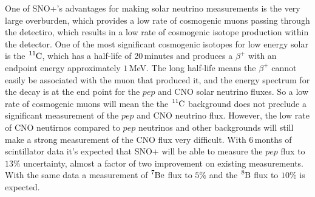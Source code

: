 One of SNO+'s advantages for making solar neutrino measurements is the
very large overburden, which provides a low rate of cosmogenic 
muons passing through the detectiro, which results in a low rate of
cosmogenic isotope production within the detector.
One of the most significant cosmogenic isotopes for low energy solar is
the $\ce{^{11}C}$, which has a half-life of 20\,minutes and produces a
$\beta^{+}$ with an endpoint energy approximately $1$\,MeV.
The long half-life means the $\beta^{+}$ cannot easily be associated with
the muon that produced it, and the energy spectrum for the decay is at
the end point for the $pep$ and CNO solar neutrino fluxes.
So a low rate of cosmogenic muons will mean the the $\ce{^{11}C}$ background
does not preclude a significant measurement of the $pep$ and CNO neutrino flux.
However, the low rate of CNO neutirnos compared to $pep$ neutrinos and other
backgrounds will
still make a strong measurement of the CNO flux  very difficult.
With 6\,months of scintillator data it's expected that SNO+ will be able
to measure the $pep$ flux to $13\%$ uncertainty, almost a factor of two
improvement on existing measurements.
With the same data a measurement of $\ce{^{7}Be}$ flux to $5\%$ and the
$\ce{^{8}B}$ flux to $10\%$ is expected.

%
